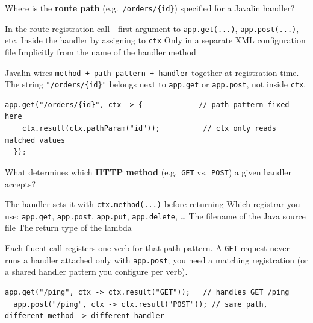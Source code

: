 \question[4]
Where is the \textbf{route path} (e.g.\ \texttt{/orders/\{id\}}) specified for a Javalin handler?
\begin{choices}
  \CorrectChoice In the route registration call---first argument to \texttt{app.get(...)}, \texttt{app.post(...)}, etc.
  \choice Inside the handler by assigning to \texttt{ctx}
  \choice Only in a separate XML configuration file
  \choice Implicitly from the name of the handler method
\end{choices}
\begin{solution}
  Javalin wires \texttt{method + path pattern + handler} together at registration time. The string \texttt{"/orders/\{id\}"} belongs next to \texttt{app.get} or \texttt{app.post}, not inside \texttt{ctx}.

  \begin{lstlisting}[style=javaexam]
  app.get("/orders/{id}", ctx -> {             // path pattern fixed here
    ctx.result(ctx.pathParam("id"));          // ctx only reads matched values
  });
  \end{lstlisting}
\end{solution}


\newpage

\question[4]
What determines which \textbf{HTTP method} (e.g.\ \texttt{GET} vs.\ \texttt{POST}) a given handler accepts?
\begin{choices}
  \choice The handler sets it with \texttt{ctx.method(...)} before returning
  \CorrectChoice Which registrar you use: \texttt{app.get}, \texttt{app.post}, \texttt{app.put}, \texttt{app.delete}, \ldots
  \choice The filename of the Java source file
  \choice The return type of the lambda
\end{choices}
\begin{solution}
  Each fluent call registers one verb for that path pattern. A \texttt{GET} request never runs a handler attached only with \texttt{app.post}; you need a matching registration (or a shared handler pattern you configure per verb).

  \begin{lstlisting}[style=javaexam]
  app.get("/ping", ctx -> ctx.result("GET"));   // handles GET /ping
  app.post("/ping", ctx -> ctx.result("POST")); // same path, different method -> different handler
  \end{lstlisting}
\end{solution}

